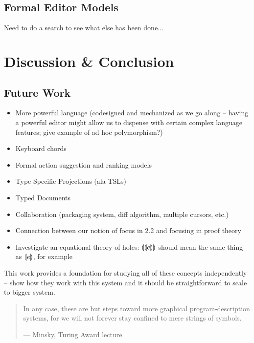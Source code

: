 \documentclass{llncs}
\begin{document}
\subsection{Formal Editor Models}
Need to do a search to see what else has been done...

\section{Discussion \& Conclusion}
\label{sec:future}
\subsection{Future Work}
\begin{itemize}
\item More powerful language (codesigned and mechanized as we go along -- having a powerful editor might allow us to dispense with certain complex language features; give example of ad hoc polymorphism?)
\item Keyboard chords
\item Formal action suggestion and ranking models
\item Type-Specific Projections (ala TSLs)
\item Typed Documents
\item Collaboration (packaging system, diff algorithm, multiple cursors, etc.)
\item Connection between our notion of focus in 2.2 and focusing in proof theory
\item Investigate an equational theory of holes: $\llparenthesis\llparenthesis e\rrparenthesis\rrparenthesis$ should
  mean the same thing as $\llparenthesis e\rrparenthesis$, for example
\end{itemize}

This work provides a foundation for studying all of these concepts independently -- show how they work with this system and it should be straightforward to scale to bigger system.

\begin{quote}
In any case, these are but steps toward more graphical program-description systems, for we will not forever stay confined to mere strings of symbols.

--- Minsky, Turing Award lecture
\end{quote}

%
%


\end{document}
